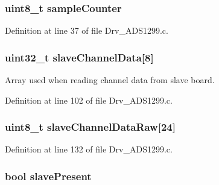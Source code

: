 \subsubsection[{\texorpdfstring{sample\+Counter}{sampleCounter}}]{\setlength{\rightskip}{0pt plus 5cm}uint8\+\_\+t sample\+Counter}\hypertarget{group__ADS1299__Library_ga5413f90a1ad32d11a00aa20df8d9ba3c}{}\label{group__ADS1299__Library_ga5413f90a1ad32d11a00aa20df8d9ba3c}


Definition at line 37 of file Drv\+\_\+\+A\+D\+S1299.\+c.

\subsubsection[{\texorpdfstring{slave\+Channel\+Data}{slaveChannelData}}]{\setlength{\rightskip}{0pt plus 5cm}uint32\+\_\+t slave\+Channel\+Data\mbox{[}8\mbox{]}}\hypertarget{group__ADS1299__Library_ga35a75511ee01afa88d18d47b2a6b401b}{}\label{group__ADS1299__Library_ga35a75511ee01afa88d18d47b2a6b401b}


Array used when reading channel data from slave board. 



Definition at line 102 of file Drv\+\_\+\+A\+D\+S1299.\+c.

\subsubsection[{\texorpdfstring{slave\+Channel\+Data\+Raw}{slaveChannelDataRaw}}]{\setlength{\rightskip}{0pt plus 5cm}uint8\+\_\+t slave\+Channel\+Data\+Raw\mbox{[}24\mbox{]}}\hypertarget{group__ADS1299__Library_gafe36c371f2977643715e7d7c88465098}{}\label{group__ADS1299__Library_gafe36c371f2977643715e7d7c88465098}


Definition at line 132 of file Drv\+\_\+\+A\+D\+S1299.\+c.

\subsubsection[{\texorpdfstring{slave\+Present}{slavePresent}}]{\setlength{\rightskip}{0pt plus 5cm}bool slave\+Present}\hypertarget{group__ADS1299__Library_ga4a8b8caa32595ce77863dd529953d13b}{}\label{group__ADS1299__Library_ga4a8b8caa32595ce77863dd529953d13b}


